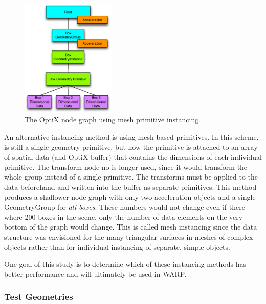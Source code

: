 \begin{figure}[h!] 
  \centering
    \includegraphics[width=0.4\textwidth]{graphics/primitive_instancing.eps}
     \caption{The OptiX node graph using mesh primitive instancing. \label{primitive_instancing} }
\end{figure}

An alternative instancing method is using mesh-based primitives.  In this scheme, is still a single geometry primitive, but now the primitive is attached to an array of spatial data (and OptiX buffer) that contains the dimensions of each individual primitive.  The transform node no is longer used, since it would transform the whole group instead of a single primitive.   The transforms must be applied to the data beforehand and written into the buffer as separate primitives.  This method produces a shallower node graph with only two acceleration objects and a single GeometryGroup for \emph{all boxes}.  These numbers would not change even if there where 200 boxes in the scene, only the number of data elements on the very bottom of the graph would change.  This is called mesh instancing since the data structure was envisioned for the many triangular surfaces in meshes of complex objects rather than for individual instancing of separate, simple objects.

One goal of this study is to determine which of these instancing methods has better performance and will ultimately be used in WARP.

\subsubsection{Test Geometries}

